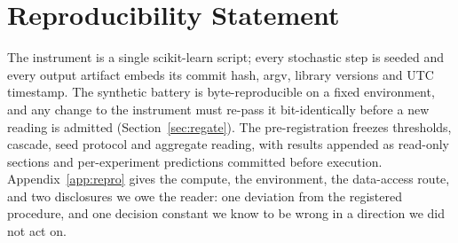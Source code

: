 \documentclass[10pt]{article} %
\begin{document}
\section*{Reproducibility Statement}

The instrument is a single scikit-learn script; every stochastic step is seeded and every output
artifact embeds its commit hash, argv, library versions and UTC timestamp. The synthetic battery is
byte-reproducible on a fixed environment, and any change to the instrument must re-pass it
bit-identically before a new reading is admitted (Section~\ref{sec:regate}). The pre-registration
freezes thresholds, cascade, seed protocol and aggregate reading, with results appended as
read-only sections and per-experiment predictions committed before execution. Appendix~\ref{app:repro} gives the compute, the environment, the data-access route, and two disclosures we owe the
reader: one deviation from the registered procedure, and one decision constant we know to be wrong
in a direction we did not act on.



\end{document}
